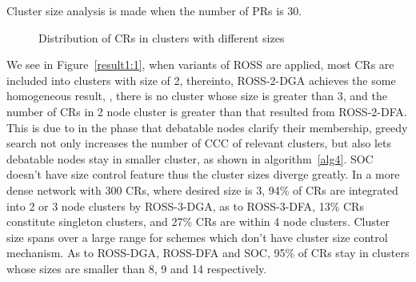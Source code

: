 Cluster size analysis is made when the number of PRs is 30.

\begin{figure}[ht]
\begin{center}
{}
\end{center} 
\caption[Cluster sizes]{Distribution of CRs in clusters with different sizes} %
\label{result1}
\end{figure}

We see in Figure~\ref{result1:1}, when variants of ROSS are applied, most CRs are included into clusters with size of 2, thereinto, ROSS-2-DGA achieves the some homogeneous result, \ie, there is no cluster whose size is greater than 3, and the number of CRs in 2 node cluster is greater than that resulted from ROSS-2-DFA.
This is due to in the phase that debatable nodes clarify their membership, greedy search not only increases the number of CCC of relevant clusters, but also lets debatable nodes stay in smaller cluster, as shown in algorithm~\ref{alg4}.
SOC doesn't have size control feature thus the cluster sizes diverge greatly.
In a more dense network with 300 CRs, where desired size is 3, 94\% of CRs are integrated into 2 or 3 node clusters by ROSS-3-DGA, as to ROSS-3-DFA, 13\% CRs constitute singleton clusters, and 27\% CRs are within 4 node clusters.
Cluster size spans over a large range for schemes which don't have cluster size control mechanism.
As to ROSS-DGA, ROSS-DFA and SOC, 95\% of CRs stay in clusters whose sizes are smaller than 8, 9 and 14 respectively.



